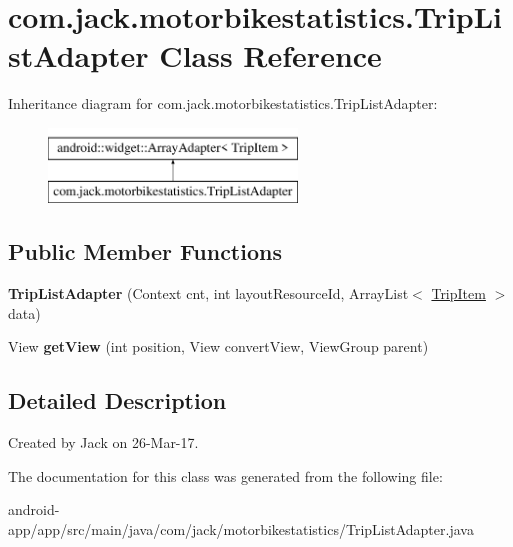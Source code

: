 \hypertarget{classcom_1_1jack_1_1motorbikestatistics_1_1_trip_list_adapter}{}\section{com.\+jack.\+motorbikestatistics.\+Trip\+List\+Adapter Class Reference}
\label{classcom_1_1jack_1_1motorbikestatistics_1_1_trip_list_adapter}
Inheritance diagram for com.\+jack.\+motorbikestatistics.\+Trip\+List\+Adapter\+:\begin{figure}[H]
\begin{center}
\leavevmode
\includegraphics[height=2.000000cm]{classcom_1_1jack_1_1motorbikestatistics_1_1_trip_list_adapter}
\end{center}
\end{figure}
\subsection*{Public Member Functions}
\begin{DoxyCompactItemize}
\item 
\mbox{\label{classcom_1_1jack_1_1motorbikestatistics_1_1_trip_list_adapter_ace5ca232bac9a2a6e0d1b61e88b35546}} 
{\bfseries Trip\+List\+Adapter} (Context cnt, int layout\+Resource\+Id, Array\+List$<$ \hyperlink{classcom_1_1jack_1_1motorbikestatistics_1_1_trip_item}{Trip\+Item} $>$ data)
\item 
\mbox{\label{classcom_1_1jack_1_1motorbikestatistics_1_1_trip_list_adapter_a1cfdc3feff28941d18e70ce0979d959d}} 
View {\bfseries get\+View} (int position, View convert\+View, View\+Group parent)
\end{DoxyCompactItemize}


\subsection{Detailed Description}
Created by Jack on 26-\/\+Mar-\/17. 

The documentation for this class was generated from the following file\+:\begin{DoxyCompactItemize}
\item 
android-\/app/app/src/main/java/com/jack/motorbikestatistics/Trip\+List\+Adapter.\+java\end{DoxyCompactItemize}

